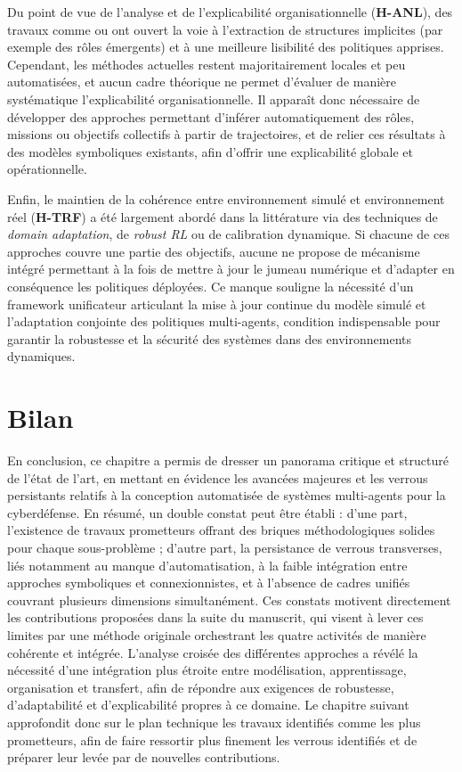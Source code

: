

Du point de vue de l’analyse et de l’explicabilité organisationnelle (\textbf{H-ANL}), des travaux comme  ou  ont ouvert la voie à l’extraction de structures implicites (par exemple des rôles émergents) et à une meilleure lisibilité des politiques apprises. Cependant, les méthodes actuelles restent majoritairement locales et peu automatisées, et aucun cadre théorique ne permet d’évaluer de manière systématique l’explicabilité organisationnelle. Il apparaît donc nécessaire de développer des approches permettant d’inférer automatiquement des rôles, missions ou objectifs collectifs à partir de trajectoires, et de relier ces résultats à des modèles symboliques existants, afin d’offrir une explicabilité globale et opérationnelle.

Enfin, le maintien de la cohérence entre environnement simulé et environnement réel (\textbf{H-TRF}) a été largement abordé dans la littérature via des techniques de \textit{domain adaptation}, de \textit{robust RL} ou de calibration dynamique. Si chacune de ces approches couvre une partie des objectifs, aucune ne propose de mécanisme intégré permettant à la fois de mettre à jour le jumeau numérique et d’adapter en conséquence les politiques déployées. Ce manque souligne la nécessité d’un framework unificateur articulant la mise à jour continue du modèle simulé et l’adaptation conjointe des politiques multi-agents, condition indispensable pour garantir la robustesse et la sécurité des systèmes dans des environnements dynamiques.



\section{Bilan}
\noindent En conclusion, ce chapitre a permis de dresser un panorama critique et structuré de l’état de l’art, en mettant en évidence les avancées majeures et les verrous persistants relatifs à la conception automatisée de systèmes multi-agents pour la cyberdéfense. En résumé, un double constat peut être établi : d’une part, l’existence de travaux prometteurs offrant des briques méthodologiques solides pour chaque sous-problème ; d’autre part, la persistance de verrous transverses, liés notamment au manque d’automatisation, à la faible intégration entre approches symboliques et connexionnistes, et à l’absence de cadres unifiés couvrant plusieurs dimensions simultanément. Ces constats motivent directement les contributions proposées dans la suite du manuscrit, qui visent à lever ces limites par une méthode originale orchestrant les quatre activités de manière cohérente et intégrée. L’analyse croisée des différentes approches a révélé la nécessité d’une intégration plus étroite entre modélisation, apprentissage, organisation et transfert, afin de répondre aux exigences de robustesse, d’adaptabilité et d’explicabilité propres à ce domaine. Le chapitre suivant approfondit donc sur le plan technique les travaux identifiés comme les plus prometteurs, afin de faire ressortir plus finement les verrous identifiés et de préparer leur levée par de nouvelles contributions.

